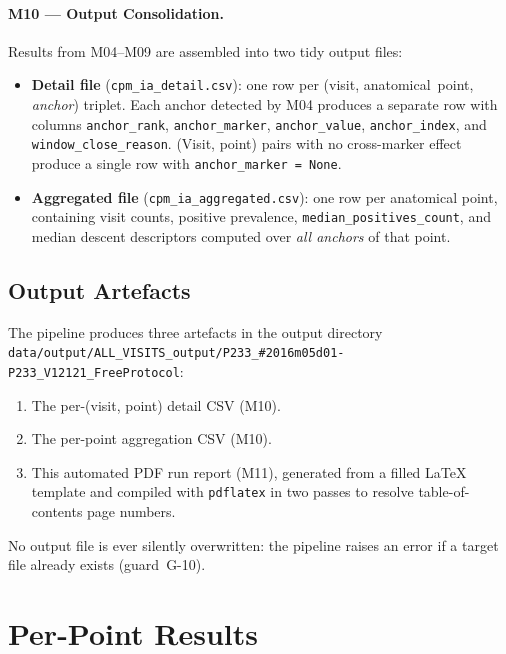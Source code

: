 \documentclass[a4paper,11pt]{article}
\begin{document}
\paragraph{M10 --- Output Consolidation.}
Results from M04--M09 are assembled into two tidy output files:
\begin{itemize}
  \item \textbf{Detail file} (\texttt{cpm\_ia\_detail.csv}): one row per
        (visit, anatomical~point, \emph{anchor}) triplet. Each anchor detected by M04
        produces a separate row with columns \texttt{anchor\_rank},
        \texttt{anchor\_marker}, \texttt{anchor\_value}, \texttt{anchor\_index},
        and \texttt{window\_close\_reason}.
        (Visit, point) pairs with no cross-marker effect produce a single row with
        \texttt{anchor\_marker = None}.
  \item \textbf{Aggregated file} (\texttt{cpm\_ia\_aggregated.csv}): one row per
        anatomical point, containing visit counts, positive prevalence,
        \texttt{median\_positives\_count}, and median descent descriptors computed over
        \emph{all anchors} of that point.
\end{itemize}

\subsection{Output Artefacts}

The pipeline produces three artefacts in the output directory \texttt{data/output/ALL\_VISITS\_output/P233\_\#2016m05d01-P233\_V12121\_FreeProtocol}:
\begin{enumerate}
  \item The per-(visit, point) detail CSV (M10).
  \item The per-point aggregation CSV (M10).
  \item This automated PDF run report (M11), generated from a filled \LaTeX{} template
        and compiled with \texttt{pdflatex} in two passes to resolve table-of-contents
        page numbers.
\end{enumerate}
No output file is ever silently overwritten: the pipeline raises an error if a target
file already exists (guard~G-10).

\section{Per-Point Results}
\end{document}
